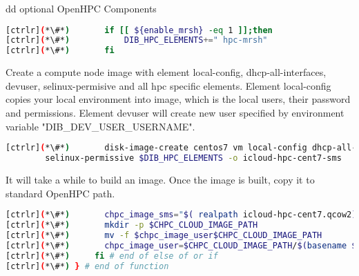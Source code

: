 	dd optional OpenHPC Components


\begin{lstlisting}[language=bash,keywords={}]
[ctrlr](*\#*)       if [[ ${enable_mrsh} -eq 1 ]];then
[ctrlr](*\#*)           DIB_HPC_ELEMENTS+=" hpc-mrsh"
[ctrlr](*\#*)       fi
\end{lstlisting} 

	Create a compute node image with element local-config, dhcp-all-interfaces, devuser, selinux-permisive and all hpc specific elements. Element local-config copies your local environment into image, which is the local users, their password and permissions. Element devuser will create new user specified by environment variable "DIB\_DEV\_USER\_USERNAME". 


\begin{lstlisting}[language=bash,keywords={}]
[ctrlr](*\#*)       disk-image-create centos7 vm local-config dhcp-all-interfaces devuser \
        selinux-permissive $DIB_HPC_ELEMENTS -o icloud-hpc-cent7-sms
\end{lstlisting} 


	It will take a while to build an image. Once the image is built, copy it to standard OpenHPC path.


\begin{lstlisting}[language=bash,keywords={}]
[ctrlr](*\#*)       chpc_image_sms="$( realpath icloud-hpc-cent7.qcow2)"
[ctrlr](*\#*)       mkdir -p $CHPC_CLOUD_IMAGE_PATH
[ctrlr](*\#*)       mv -f $chpc_image_user$CHPC_CLOUD_IMAGE_PATH
[ctrlr](*\#*)       chpc_image_user=$CHPC_CLOUD_IMAGE_PATH/$(basename $chpc_image_sms)
[ctrlr](*\#*)     fi # end of else of or if
[ctrlr](*\#*) } # end of function
\end{lstlisting} 

